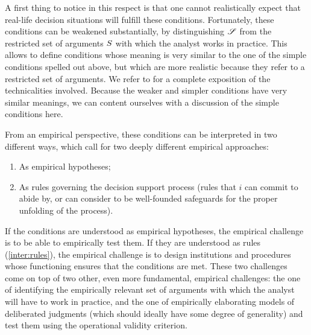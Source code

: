 \documentclass[version=3.21, pagesize, twoside=off, bibliography=totoc, DIV=calc, fontsize=12pt, a4paper, french, english]{scrartcl}
\begin{document}
A first thing to notice in this respect is that one cannot realistically expect that real-life decision situations will fulfill these conditions. Fortunately, these conditions can be weakened substantially, by distinguishing $\mathscr{S}$ from the restricted set of arguments $S$ with which the analyst works in practice. This allows to define conditions whose meaning is very similar to the one of the simple conditions spelled out above, but which are more realistic because they refer to a restricted set of arguments. We refer to \citet{cailloux_formal_2019} for a complete exposition of the technicalities involved. Because the weaker and simpler conditions have very similar meanings, we can content ourselves with a discussion of the simple conditions here. 

From an empirical perspective, these conditions can be interpreted in two different ways, which call for two deeply different empirical approaches:
\begin{enumerate}[label=\emph{\roman*}, ref=\emph{\roman*}]
		\item \label{inter:empir} As empirical hypotheses;
	\item \label{inter:rules} As rules governing the decision support process (rules that $i$ can commit to abide by, or can consider to be well-founded safeguards for the proper unfolding of the process).
\end{enumerate}

If the conditions are understood as empirical hypotheses, the empirical challenge is to be able to empirically test them. If they are understood as rules (\ref{inter:rules}), the empirical challenge is to design institutions and procedures whose functioning ensures that the conditions are met. These two challenges come on top of two other, even more fundamental, empirical challenges: the one of identifying the empirically relevant set of arguments with which the analyst will have to work in practice, and the one of empirically elaborating models of deliberated judgments (which should ideally have some degree of generality)  and test them using the operational validity criterion.
\end{document}
